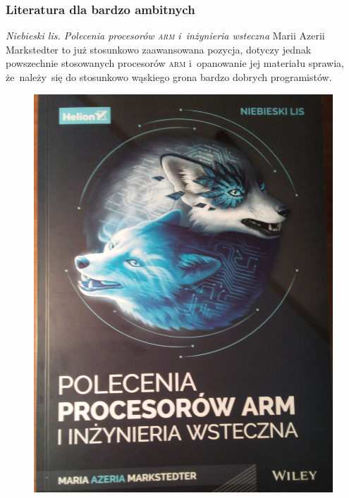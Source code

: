 \documentclass[10pt,t]{beamer}
\begin{document}
\begin{frame}
  \frametitle{Literatura dla bardzo ambitnych}


  \textit{Niebieski lis. Polecenia procesorów \textsc{arm} i~inżynieria
    wsteczna} Marii Azerii Markstedter to już stosunkowo zaawansowana
  pozycja, dotyczy jednak powszechnie stosowanych procesorów \textsc{arm}
  i~opanowanie jej materiału sprawia, że~należy~się do stosunkowo wąskiego
  grona bardzo dobrych programistów.





  \begin{figure}

    \centering

    \includegraphics[scale=0.0325]
    {./Presentations-pictures/Niebieski-lis.jpg}

  \end{figure}

\end{frame}
\end{document}
